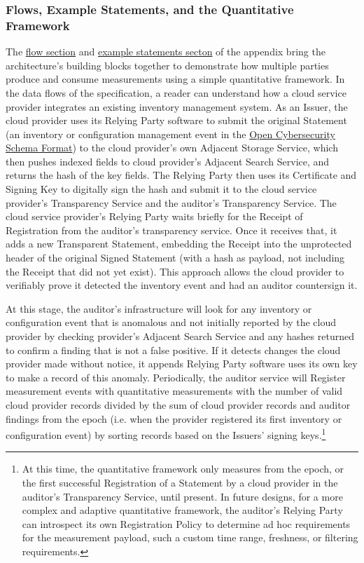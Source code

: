 \documentclass{jdf}
\begin{document}
\subsubsection{Flows, Example Statements, and the Quantitative Framework}

The \href{https://github.com/aj-stein/practicum/pull/1}{flow section} and \href{https://aj-stein.github.io/conmotion/architecture.html#example-statements}{example statements secton} of the appendix bring the architecture's building blocks together to demonstrate how multiple parties produce and consume measurements using a simple quantitative framework. In the data flows of the specification, a reader can understand how a cloud service provider integrates an existing inventory management system. As an Issuer, the cloud provider uses its Relying Party software to submit the original Statement (an inventory or configuration management event in the \href{https://schema.ocsf.io/}{Open Cybersecurity Schema Format}) to the cloud provider's own Adjacent Storage Service, which then pushes indexed fields to cloud provider's Adjacent Search Service, and returns the hash of the key fields. The Relying Party then uses its Certificate and Signing Key to digitally sign the hash and submit it to the cloud service provider's Transparency Service and the auditor's Transparency Service. The cloud service provider's Relying Party waits briefly for the Receipt of Registration from the auditor's transparency service. Once it receives that, it adds a new Transparent Statement, embedding the Receipt into the unprotected header of the original Signed Statement (with a hash as payload, not including the Receipt that did not yet exist). This approach allows the cloud provider to verifiably prove it detected the inventory event and had an auditor countersign it. 

At this stage, the auditor's infrastructure will look for any inventory or configuration event that is anomalous and not initially reported by the cloud provider by checking provider's Adjacent Search Service and any hashes returned to confirm a finding that is not a false positive. If it detects changes the cloud provider made without notice, it appends Relying Party software uses its own key to make a record of this anomaly. Periodically, the auditor service will Register measurement events with quantitative measurements with the number of valid cloud provider records divided by the sum of cloud provider records and auditor findings from the epoch (i.e. when the provider registered its first inventory or configuration event) by sorting records based on the Issuers' signing keys.\footnote{At this time, the quantitative framework only measures from the epoch, or the first successful Registration of a Statement by a cloud provider in the auditor's Transparency Service, until present. In future designs, for a more complex and adaptive quantitative framework, the auditor's Relying Party can introspect its own Registration Policy to determine ad hoc requirements for the measurement payload, such a custom time range, freshness, or filtering requirements.}
\end{document}
